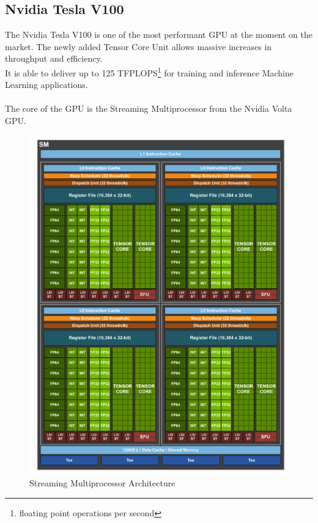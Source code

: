 \subsection{Nvidia Tesla V100}
The Nvidia Tesla V100 is one of the most performant GPU at the moment on the market. The newly added Tensor Core Unit allows massive increases in throughput and efficiency.\\It is able to deliver up to 125 TFPLOPS\footnote{floating point operations per second} for training and inference Machine Learning applications. \\\\

The core of the GPU is the Streaming Multiprocessor from the Nvidia Volta GPU.
\begin{figure}[!htbp]
\centering
\captionsetup{justification=centering}
\includegraphics[scale=0.9]{./figure/volta_sm_arch.PNG}
\caption{Streaming Multiprocessor Architecture \cite{paper:41}}
\label{fig:voltasmarch}
\end{figure}

